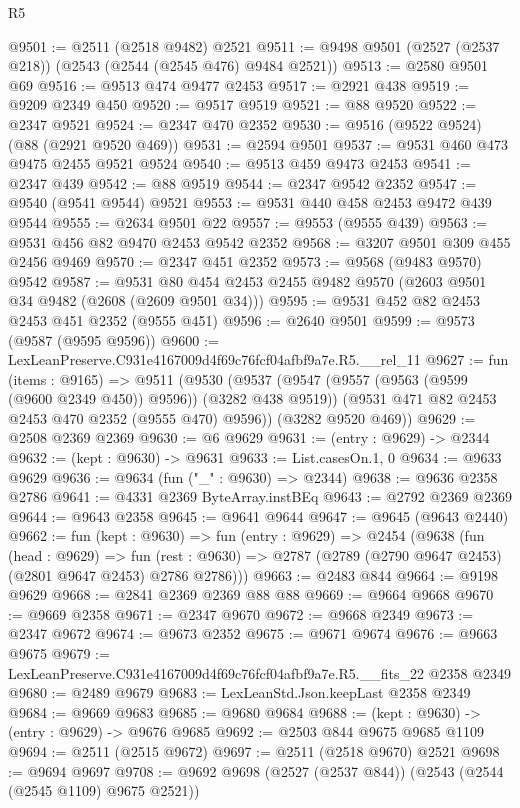 \begin{lexlean}{R5}
\begin{coremodule}
@9501 := @2511 (@2518 @9482) @2521
@9511 := @9498 @9501 (@2527 (@2537 @218)) (@2543 (@2544 (@2545 @476) @9484 @2521))
@9513 := @2580 @9501 @69
@9516 := @9513 @474 @9477 @2453
@9517 := @2921 @438
@9519 := @9209 @2349 @450
@9520 := @9517 @9519
@9521 := @88 @9520
@9522 := @2347 @9521
@9524 := @2347 @470 @2352
@9530 := @9516 (@9522 @9524) (@88 (@2921 @9520 @469))
@9531 := @2594 @9501
@9537 := @9531 @460 @473 @9475 @2455 @9521 @9524
@9540 := @9513 @459 @9473 @2453
@9541 := @2347 @439
@9542 := @88 @9519
@9544 := @2347 @9542 @2352
@9547 := @9540 (@9541 @9544) @9521
@9553 := @9531 @440 @458 @2453 @9472 @439 @9544
@9555 := @2634 @9501 @22
@9557 := @9553 (@9555 @439)
@9563 := @9531 @456 @82 @9470 @2453 @9542 @2352
@9568 := @3207 @9501 @309 @455 @2456 @9469
@9570 := @2347 @451 @2352
@9573 := @9568 (@9483 @9570) @9542
@9587 := @9531 @80 @454 @2453 @2455 @9482 @9570 (@2603 @9501 @34 @9482 (@2608 (@2609 @9501 @34)))
@9595 := @9531 @452 @82 @2453 @2453 @451 @2352 (@9555 @451)
@9596 := @2640 @9501
@9599 := @9573 (@9587 (@9595 @9596))
@9600 := LexLeanPreserve.C931e4167009d4f69c76fcf04afbf9a7e.R5.__rel_11
@9627 := fun (items : @9165) =>
  @9511
    (@9530
      (@9537
        (@9547 (@9557 (@9563 (@9599 (@9600 @2349 @450)) @9596)) (@3282 @438 @9519))
        (@9531 @471 @82 @2453 @2453 @470 @2352 (@9555 @470) @9596))
      (@3282 @9520 @469))
@9629 := @2508 @2369 @2369
@9630 := @6 @9629
@9631 := (entry : @9629) -> @2344
@9632 := (kept : @9630) -> @9631
@9633 := List.casesOn.{1, 0}
@9634 := @9633 @9629
@9636 := @9634 (fun ("_" : @9630) => @2344)
@9638 := @9636 @2358 @2786
@9641 := @4331 @2369 ByteArray.instBEq
@9643 := @2792 @2369 @2369
@9644 := @9643 @2358
@9645 := @9641 @9644
@9647 := @9645 (@9643 @2440)
@9662 := fun (kept : @9630) =>
  fun (entry : @9629) =>
  @2454
    (@9638
      (fun (head : @9629) =>
      fun (rest : @9630) => @2787 (@2789 (@2790 @9647 @2453) (@2801 @9647 @2453) @2786 @2786)))
@9663 := @2483 @844
@9664 := @9198 @9629
@9668 := @2841 @2369 @2369 @88 @88
@9669 := @9664 @9668
@9670 := @9669 @2358
@9671 := @2347 @9670
@9672 := @9668 @2349
@9673 := @2347 @9672
@9674 := @9673 @2352
@9675 := @9671 @9674
@9676 := @9663 @9675
@9679 := LexLeanPreserve.C931e4167009d4f69c76fcf04afbf9a7e.R5.__fits_22 @2358 @2349
@9680 := @2489 @9679
@9683 := LexLeanStd.Json.keepLast @2358 @2349
@9684 := @9669 @9683
@9685 := @9680 @9684
@9688 := (kept : @9630) -> (entry : @9629) -> @9676 @9685
@9692 := @2503 @844 @9675 @9685 @1109
@9694 := @2511 (@2515 @9672)
@9697 := @2511 (@2518 @9670) @2521
@9698 := @9694 @9697
@9708 := @9692 @9698 (@2527 (@2537 @844)) (@2543 (@2544 (@2545 @1109) @9675 @2521))

\end{coremodule}
\end{lexlean}

